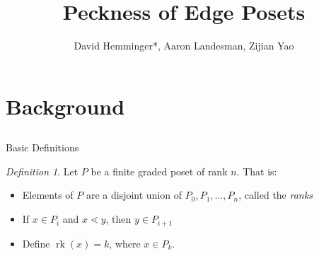\documentclass{beamer}
\title{Peckness of Edge Posets}
\author{David Hemminger*\inst{1}, Aaron Landesman\inst{2}, Zijian Yao\inst{3}}
\institute[VFU] %
{
  \inst{1}
  Duke University
,
  \inst{2}
  Harvard University
  ,
  \inst{3}
  Brown University
}
\theoremstyle{remark}
\newtheorem{defn}[thm]{Definition}
\newcommand\rk{\operatorname{rk}}
\begin{document}
\begin{frame}
	\titlepage
\end{frame}









\section{Background}
\subsection{}




\begin{frame}{Basic Definitions}

\begin{defn}
Let $P$ be a finite graded poset of rank $n$. That is:
\begin{itemize}
\item Elements of $P$ are a disjoint union of $P_0,P_1,\ldots,P_n$, called the \textit{ranks}
\item If $x\in P_i$ and $x\lessdot y$, then $y\in P_{i+1}$
\item Define $\rk(x) = k$, where $x\in P_k$.
\end{itemize}
\end{defn}

\end{frame}
\end{document}
